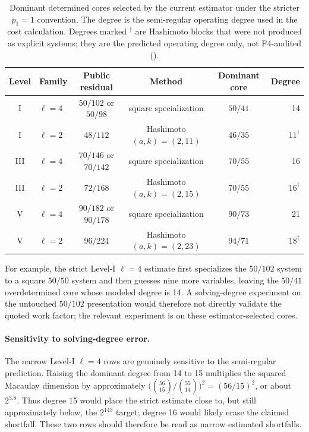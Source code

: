 \documentclass[11pt]{article}
\begin{document}
\begin{table}[t]
\centering
\caption{Dominant determined cores selected by the current estimator under the
stricter $p_1=1$ convention.  The degree is the semi-regular operating degree
used in the cost calculation.  Degrees marked $^\dagger$ are Hashimoto blocks
that were not produced as explicit systems; they are the predicted operating
degree only, not F4-audited ().}
\label{tab:actual-cores}
\small
\setlength{\tabcolsep}{4pt}
\begin{tabular}{@{}c l c c c r@{}}
\toprule
Level & Family & Public residual & Method & Dominant core & Degree\\
\midrule
I   & $\ell=4$ & $50/102$ or $50/98$ & square specialization & $50/41$ & 14\\
I   & $\ell=2$ & $48/112$ & Hashimoto $(a,k)=(2,11)$ & $46/35$ & $11^\dagger$\\
III & $\ell=4$ & $70/146$ or $70/142$ & square specialization & $70/55$ & 16\\
III & $\ell=2$ & $72/168$ & Hashimoto $(a,k)=(2,15)$ & $70/55$ & $16^\dagger$\\
V   & $\ell=4$ & $90/182$ or $90/178$ & square specialization & $90/73$ & 21\\
V   & $\ell=2$ & $96/224$ & Hashimoto $(a,k)=(2,23)$ & $94/71$ & $18^\dagger$\\
\bottomrule
\end{tabular}
\end{table}

For example, the strict Level-I $\ell=4$ estimate first specializes the $50/102$
system to a square $50/50$ system and then guesses nine more variables, leaving
the $50/41$ overdetermined core whose modeled degree is 14.  A solving-degree
experiment on the untouched $50/102$ presentation would therefore not directly
validate the quoted work factor; the relevant experiment is on these
estimator-selected cores.

\paragraph{Sensitivity to solving-degree error.}
The narrow Level-I $\ell=4$ rows are genuinely sensitive to the semi-regular
prediction.  Raising the dominant degree from 14 to 15 multiplies the squared
Macaulay dimension by approximately $\bigl(\binom{56}{15}/\binom{55}{14}\bigr)^2
=(56/15)^2$, or about $2^{3.8}$.  Thus degree 15 would place the strict estimate
close to, but still approximately below, the $2^{143}$ target; degree 16 would
likely erase the claimed shortfall.  These two rows should therefore be read as
narrow estimated shortfalls.
\end{document}
